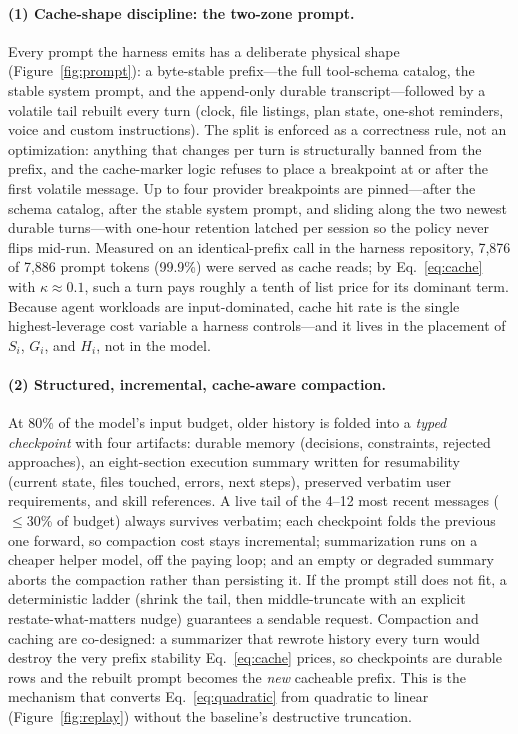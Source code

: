\documentclass[11pt]{article}
\begin{document}
\paragraph{(1) Cache-shape discipline: the two-zone prompt.}
Every prompt the harness emits has a deliberate physical shape (Figure~\ref{fig:prompt}): a byte-stable prefix---the full tool-schema catalog, the stable system prompt, and the append-only durable transcript---followed by a volatile tail rebuilt every turn (clock, file listings, plan state, one-shot reminders, voice and custom instructions). The split is enforced as a correctness rule, not an optimization: anything that changes per turn is structurally banned from the prefix, and the cache-marker logic refuses to place a breakpoint at or after the first volatile message. Up to four provider breakpoints are pinned---after the schema catalog, after the stable system prompt, and sliding along the two newest durable turns---with one-hour retention latched per session so the policy never flips mid-run. Measured on an identical-prefix call in the harness repository, 7{,}876 of 7{,}886 prompt tokens (99.9\%) were served as cache reads; by Eq.~\eqref{eq:cache} with $\kappa\!\approx\!0.1$, such a turn pays roughly a tenth of list price for its dominant term. Because agent workloads are input-dominated, cache hit rate is the single highest-leverage cost variable a harness controls---and it lives in the placement of $S_i$, $G_i$, and $H_i$, not in the model.

\paragraph{(2) Structured, incremental, cache-aware compaction.}
At 80\% of the model's input budget, older history is folded into a \emph{typed checkpoint} with four artifacts: durable memory (decisions, constraints, rejected approaches), an eight-section execution summary written for resumability (current state, files touched, errors, next steps), preserved verbatim user requirements, and skill references. A live tail of the 4--12 most recent messages ($\le$30\% of budget) always survives verbatim; each checkpoint folds the previous one forward, so compaction cost stays incremental; summarization runs on a cheaper helper model, off the paying loop; and an empty or degraded summary aborts the compaction rather than persisting it. If the prompt still does not fit, a deterministic ladder (shrink the tail, then middle-truncate with an explicit restate-what-matters nudge) guarantees a sendable request. Compaction and caching are co-designed: a summarizer that rewrote history every turn would destroy the very prefix stability Eq.~\eqref{eq:cache} prices, so checkpoints are durable rows and the rebuilt prompt becomes the \emph{new} cacheable prefix. This is the mechanism that converts Eq.~\eqref{eq:quadratic} from quadratic to linear (Figure~\ref{fig:replay}) without the baseline's destructive truncation.
\end{document}
